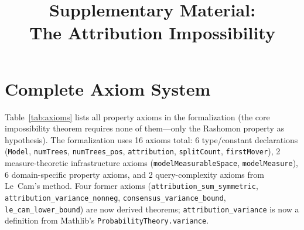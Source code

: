 \documentclass{article}
\title{Supplementary Material:\\The Attribution Impossibility}
\author{}
\date{}
\begin{document}
\maketitle

\setcounter{theorem}{10}   %
\setcounter{axiom}{1}      %
\setcounter{figure}{2}     %
\setcounter{table}{0}      %

\tableofcontents
\newpage

\section{Complete Axiom System}

\begin{sloppypar}
Table~\ref{tab:axioms} lists all property axioms in the formalization
(the core impossibility theorem requires none of them---only the Rashomon
property as hypothesis).
The formalization uses 16 axioms total: 6 type/constant declarations
(\texttt{Model}, \texttt{numTrees}, \texttt{numTrees\_pos}, \texttt{attribution},
\texttt{splitCount}, \texttt{firstMover}), 2 measure-theoretic infrastructure
axioms (\texttt{modelMeasurableSpace}, \texttt{modelMeasure}),
6 domain-specific property axioms, and
2 query-complexity axioms from Le~Cam's method. Four former axioms
(\texttt{attribution\_sum\_symmetric}, \texttt{attribution\_variance\_nonneg},
\texttt{consensus\_variance\_bound}, \texttt{le\_cam\_lower\_bound})
are now derived theorems; \texttt{attribution\_variance} is now a definition
from Mathlib's \texttt{ProbabilityTheory.variance}.
\end{sloppypar}
\end{document}
